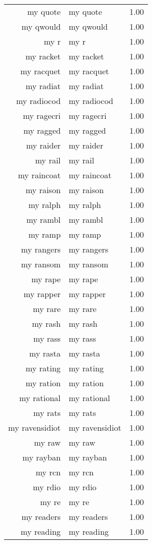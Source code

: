 \begin{table}[ht]
\begin{tabular}{rlr}
  my quote & my quote & 1.00 \\ 
  my qwould & my qwould & 1.00 \\ 
  my r & my r & 1.00 \\ 
  my racket & my racket & 1.00 \\ 
  my racquet & my racquet & 1.00 \\ 
  my radiat & my radiat & 1.00 \\ 
  my radiocod & my radiocod & 1.00 \\ 
  my ragecri & my ragecri & 1.00 \\ 
  my ragged & my ragged & 1.00 \\ 
  my raider & my raider & 1.00 \\ 
  my rail & my rail & 1.00 \\ 
  my raincoat & my raincoat & 1.00 \\ 
  my raison & my raison & 1.00 \\ 
  my ralph & my ralph & 1.00 \\ 
  my rambl & my rambl & 1.00 \\ 
  my ramp & my ramp & 1.00 \\ 
  my rangers & my rangers & 1.00 \\ 
  my ransom & my ransom & 1.00 \\ 
  my rape & my rape & 1.00 \\ 
  my rapper & my rapper & 1.00 \\ 
  my rare & my rare & 1.00 \\ 
  my rash & my rash & 1.00 \\ 
  my rass & my rass & 1.00 \\ 
  my rasta & my rasta & 1.00 \\ 
  my rating & my rating & 1.00 \\ 
  my ration & my ration & 1.00 \\ 
  my rational & my rational & 1.00 \\ 
  my rats & my rats & 1.00 \\ 
  my ravensidiot & my ravensidiot & 1.00 \\ 
  my raw & my raw & 1.00 \\ 
  my rayban & my rayban & 1.00 \\ 
  my rcn & my rcn & 1.00 \\ 
  my rdio & my rdio & 1.00 \\ 
  my re & my re & 1.00 \\ 
  my readers & my readers & 1.00 \\ 
  my reading & my reading & 1.00 \\ 

\end{tabular}
\end{table}

